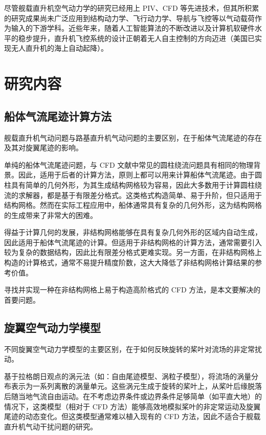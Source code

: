 尽管舰载直升机空气动力学的研究已经用上 PIV、CFD 等先进技术，但其所积累的研究成果尚未广泛应用到结构动力学、飞行动力学、导航与飞控等以气动载荷作为输入的下游学科。近些年来，随着人工智能算法的不断改进以及计算机软硬件水平的稳步提升，直升机飞控系统的设计正朝着无人自主控制的方向迈进（美国已实现无人直升机的海上自动起降）。

\newpage{}

\section{研究内容}

\subsection{船体气流尾迹计算方法}

舰载直升机气动问题与路基直升机气动问题的主要区别，在于船体气流尾迹的存在及其对旋翼尾迹的影响。

单纯的船体气流尾迹问题，与 CFD 文献中常见的圆柱绕流问题具有相同的物理背景。因此，适用于后者的计算方法，原则上都可以用来计算船体气流尾迹。由于圆柱具有简单的几何外形，为其生成结构网格较为容易，因此大多数用于计算圆柱绕流的求解器，都是基于有限差分格式。这类格式构造简单、易于升阶，但只适用于结构网格。然而在实际工程应用中，船体通常具有复杂的几何外形，这为结构网格的生成带来了非常大的困难。

得益于计算几何的发展，非结构网格能够在具有复杂几何外形的区域内自动生成，因此适用于船体气流尾迹的计算。但适用于非结构网格的计算方法，通常需要引入较为复杂的数据结构，因此比有限差分格式更难实现。另一方面，在非结构网格上构造的计算格式，通常不易提升精度阶数，这大大降低了非结构网格计算结果的参考价值。

寻找并实现一种在非结构网格上易于构造高阶格式的 CFD 方法，是本文要解决的首要问题。

\subsection{旋翼空气动力学模型}

不同旋翼空气动力学模型的主要区别，在于如何反映旋转的桨叶对流场的非定常扰动。

基于拉格朗日观点的涡元法（如：自由尾迹模型、涡粒子模型），将流场的涡量分布表示为一系列离散的涡量单元。这些涡元生成于旋转的桨叶上，从桨叶后缘脱落后随当地气流自由运动。在不考虑边界条件或边界条件足够简单（如平直大地）的情况下，这类模型（相对于
CFD 方法）能够高效地模拟桨叶的非定常运动及旋翼尾迹的动态变化。但这类模型通常难以植入现有的 CFD 方法，因此不适合于舰载直升机气动干扰问题的研究。

